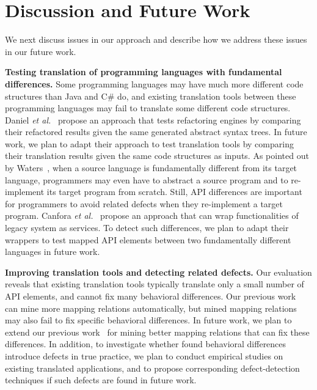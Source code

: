 

\section{Discussion and Future Work}
\label{sec:discuss}

We next discuss issues in our approach and describe how we address
these issues in our future work.

\textbf{Testing translation of programming languages with fundamental differences.} Some programming languages may have much more different code structures than Java and C\# do, and existing translation tools between these programming languages may fail to translate some different code structures. Daniel \emph{et al.}~\cite{daniel2007automated} propose an approach that tests refactoring engines by comparing their refactored results given the same generated abstract syntax trees. In future work, we plan to adapt their approach to test translation tools by comparing their translation results given the same code structures as inputs. As pointed out by Waters~\cite{waters1988program}, when a source language is fundamentally different from its target language, programmers may even have to abstract a source program and to re-implement its target program from scratch. Still, API differences are important for programmers to avoid related defects when they re-implement a target program. Canfora \emph{et al.}~\cite{CanforaFFT08} propose an approach that can wrap functionalities of legacy system as services. To detect such differences, we plan to adapt their wrappers to test mapped API elements between two fundamentally different languages in future work.

\textbf{Improving translation tools and detecting related defects.} Our evaluation reveals that existing translation tools typically translate only a small number of API elements, and cannot fix many behavioral differences. Our previous work~\cite{zhong2010mining} can mine more mapping relations automatically, but mined mapping relations may also fail to fix specific behavioral differences. In future work, we plan to extend our previous work~\cite{zhong2010mining} for mining better mapping relations that can fix these differences. In addition, to investigate whether found behavioral differences introduce defects in true practice, we plan to conduct empirical studies on existing translated applications, and to propose corresponding defect-detection techniques if such defects are found in future work.

